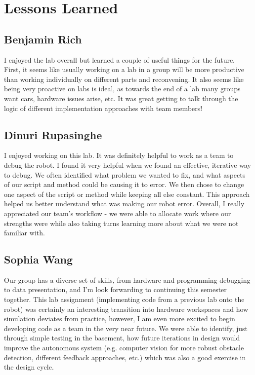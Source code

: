 \documentclass{article}
\begin{document}
\section{Lessons Learned}

\subsection{Benjamin Rich}
I enjoyed the lab overall but learned a couple of useful things for the future. First, it seems like usually working on a lab in a group will be more productive than working individually on different parts and reconvening. It also seems like being very proactive on labs is ideal, as towards the end of a lab many groups want cars, hardware issues arise, etc. It was great getting to talk through the logic of different implementation approaches with team members!


\subsection{Dinuri Rupasinghe}
I enjoyed working on this lab. It was definitely helpful to work as a team to debug the robot. I found it very helpful when we found an effective, iterative way to debug. We often identified what problem we wanted to fix, and what aspects of our script and method could be causing it to error. We then chose to change one aspect of the script or method while keeping all else constant. This approach helped us better understand what was making our robot error. Overall, I really appreciated our team's workflow - we were able to allocate work where our strengths were while also taking turns learning more about what we were not familiar with.

\subsection{Sophia Wang}
Our group has a diverse set of skills, from hardware and programming debugging to data presentation, and I'm look forwarding to continuing this semester together. This lab assignment (implementing code from a previous lab onto the robot) was certainly an interesting transition into hardware workspaces and how simulation deviates from practice, however, I am even more excited to begin developing code as a team in the very near future. We were able to identify, just through simple testing in the basement, how future iterations in design would improve the autonomous system (e.g. computer vision for more robust obstacle detection, different feedback approaches, etc.) which was also a good exercise in the design cycle.
\end{document}
